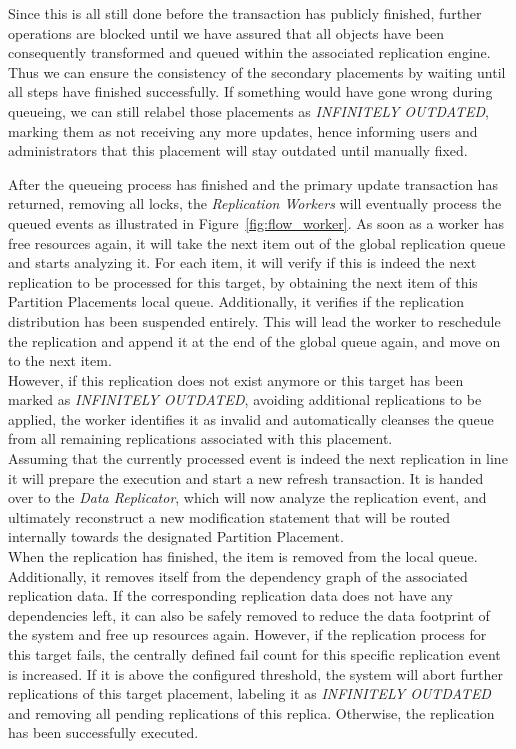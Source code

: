 Since this is all still done before the transaction has publicly finished, further operations are blocked until we have assured that all objects have been consequently 
transformed and queued within the associated replication engine. Thus we can ensure the consistency of the secondary placements by waiting until all steps have finished 
successfully. If something would have gone wrong during queueing, we can still relabel those placements as \emph{INFINITELY OUTDATED}, marking them as not receiving any more updates, 
hence informing users and administrators that this placement will stay outdated until manually fixed.

After the queueing process has finished and the primary update transaction has returned, removing all locks, the \emph{Replication Workers} will eventually process the queued events as illustrated in Figure~\ref{fig:flow_worker}.
As soon as a worker has free resources again, it will take the next item out of the global replication queue and starts analyzing it.
For each item, it will verify if this is indeed the next replication to be processed for this target, by obtaining the next item of this Partition Placements local queue.
Additionally, it verifies if the replication distribution has been suspended entirely. This will lead the worker to reschedule the replication
and append it at the end of the global queue again, and move on to the next item.\\
However, if this replication does not exist anymore or this target has been marked as \emph{INFINITELY OUTDATED}, avoiding additional replications to be applied,
the worker identifies it as invalid and automatically cleanses the queue from all remaining replications associated with this placement.\\
Assuming that the currently processed event is indeed the next replication in line it will prepare the execution and start a new refresh transaction. 
It is handed over to the \emph{Data Replicator}, which will now analyze the replication event, and ultimately reconstruct a new modification statement that will be routed internally towards 
the designated Partition Placement.\\
When the replication has finished, the item is removed from the local queue. Additionally, it removes itself from the dependency graph of the associated replication data.
If the corresponding replication data does not have any dependencies left, it can also be safely removed to reduce the data footprint of the system and free up resources again.
However, if the replication process for this target fails, the centrally defined fail count for this specific replication event is increased. 
If it is above the configured threshold, the system will abort further replications of this target placement, labeling it as \emph{INFINITELY OUTDATED} and removing all pending
replications of this replica. Otherwise, the replication has been successfully executed.

